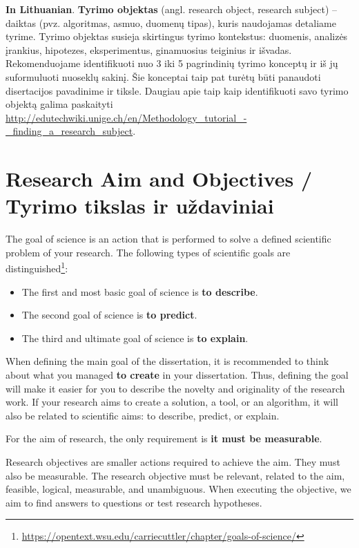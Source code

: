 \textbf{In Lithuanian}. \textbf{Tyrimo objektas} (angl. research object, research subject) – daiktas (pvz. algoritmas, asmuo, duomenų tipas), kuris naudojamas detaliame tyrime. Tyrimo objektas susieja skirtingus tyrimo kontekstus: duomenis, analizės įrankius, hipotezes, eksperimentus, ginamuosius teiginius ir išvadas. Rekomenduojame identifikuoti nuo 3 iki 5 pagrindinių tyrimo konceptų ir iš jų suformuluoti nuoseklų sakinį.
Šie konceptai taip pat turėtų būti panaudoti disertacijos pavadinime ir tiksle. Daugiau apie taip kaip identifikuoti savo tyrimo objektą galima paskaityti \url{http://edutechwiki.unige.ch/en/Methodology_tutorial_-_finding_a_research_subject}.



\section*{Research Aim and Objectives / Tyrimo tikslas ir uždaviniai}

The goal of science is an action that is performed to solve a defined scientific problem of your research.
The following types of scientific goals are distinguished\footnote{\url{https://opentext.wsu.edu/carriecuttler/chapter/goals-of-science/}}:
\begin{itemize}
    \item The first and most basic goal of science is \textbf{to describe}.
    \item The second goal of science is \textbf{to predict}.
    \item The third and ultimate goal of science is \textbf{to explain}.
\end{itemize}
When defining the main goal of the dissertation, it is recommended to think about what you managed \textbf{to create} in your dissertation. Thus, defining the goal will make it easier for you to describe the novelty and originality of the research work. 
If your research aims to create a solution, a tool, or an algorithm, it will also be related to scientific aims: to describe, predict, or explain.

For the aim of research, the only requirement is \textbf{it must be measurable}.

Research objectives are smaller actions required to achieve the aim. They must also be measurable. 
The research objective must be relevant, related to the aim, feasible, logical, measurable, and unambiguous.
When executing the objective, we aim to find answers to questions or test research hypotheses.

